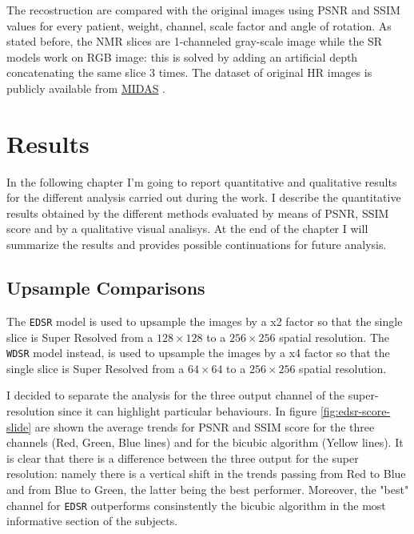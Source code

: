 \documentclass[12pt,a4paper]{report}
\begin{document}
The recostruction are compared with the original images using PSNR and SSIM values for every patient, weight, channel, scale factor and angle of rotation. 
As stated before, the NMR slices are 1-channeled gray-scale image while the SR models work on RGB image: this is solved by adding an artificial depth concatenating the same slice 3 times. 
The dataset of original HR images is publicly available from \href{http://insight-journal.org/midas/collection/view/190}{MIDAS} \cite{dataset}. 

\chapter{Results}

In the following chapter I'm going to report quantitative and qualitative results for the different analysis carried out during the work.
I describe the quantitative results obtained by the different methods evaluated by means of PSNR, SSIM score and by a qualitative visual analisys.
At the end of the chapter I will summarize the results and provides possible continuations for future analysis.  

\section{Upsample Comparisons}

The {\tt EDSR} model is used to upsample the images by a x2 factor so that the single slice is Super Resolved from a $128 \times 128$ to a $256 \times 256$ spatial resolution. 
The {\tt WDSR} model instead, is used to upsample the images by a x4 factor so that the single slice is Super Resolved from a $64 \times 64$ to a $256 \times 256$ spatial resolution. 

I decided to separate the analysis for the three output channel of the super-resolution since it can highlight particular behaviours. 
In figure \ref{fig:edsr-score-slide} are shown the average trends for PSNR and SSIM score for the three channels (Red, Green, Blue lines) and for the bicubic algorithm (Yellow lines). 
It is clear that there is a difference between the three output for the super resolution: namely there is a vertical shift in the trends passing from Red to Blue and from Blue to Green, the latter being the best performer.
Moreover, the "best" channel for {\tt EDSR} outperforms consinstently the bicubic algorithm in the most informative section of the subjects.
\end{document}
